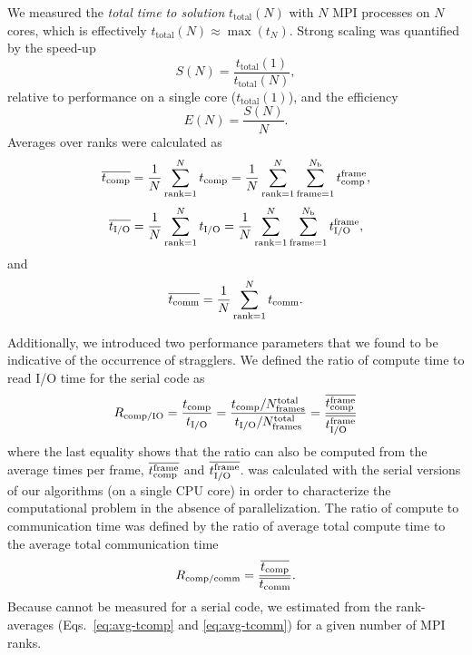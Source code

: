 We measured the \emph{total time to solution} $t_{\text{total}}(N)$ with $N$ MPI processes on $N$ cores, which is effectively
$t_{\text{total}}(N) \approx \max(t_{N})$. 
Strong scaling was quantified by the speed-up
\begin{equation}
  \label{eq:speedup}
  S(N) = \frac{t_{\text{total}}(1)}{t_{\text{total}}(N)},
\end{equation}
relative to performance on a single core ($t_{\text{total}}(1)$), and the efficiency
\begin{equation}
  \label{eq:efficiency}
  E(N) = \frac{S(N)}{N}.
\end{equation}
Averages over ranks were calculated as
\begin{equation}
  \label{eq:avg-tcomp}
  \overline{{t}_{\text{comp}}} = \frac{1}{N}
  \sum_{\text{rank}=1}^{N}{t}_{\text{comp}} = \frac{1}{N}\sum_{\text{rank}=1}^{N}\sum_{\text{frame}=1}^{N_\text{b}}{t}_{\text{comp}}^{\text{frame}},
\end{equation}
\begin{equation}
  \label{eq:avg-tIO}
  \overline{{t}_{\text{I/O}}} = \frac{1}{N}\sum_{\text{rank}=1}^{N}{t}_{\text{I/O}} = \frac{1}{N}\sum_{\text{rank}=1}^{N}\sum_{\text{frame}=1}^{N_{\text{b}}}{t}_{\text{I/O}}^{\text{frame}},
\end{equation}
and
\begin{equation}
  \label{eq:avg-tcomm}
  \overline{t_{\text{comm}}} = \frac{1}{N}\sum_{\text{rank}=1}^{N}t_{\text{comm}}.
\end{equation}

Additionally, we introduced two performance parameters that we found to be indicative of the occurrence of stragglers.
We defined the ratio of compute time to read I/O time for the serial code as
\begin{equation}
  \RcompIO = \frac{\tcomp}{\tIO} = %
  \frac{\tcomp/N_{\text{frames}}^{\text{total}}}{\tIO/N_{\text{frames}}^{\text{total}}}  = %
  \frac{\overline{\tcomp^{\text{frame}}}}{\overline{\tIO^{\text{frame}}}}  
  \label{eq:Compute-IO}
\end{equation}
where the last equality shows that the ratio can also be computed from the average times per frame, $\overline{{t}_{\text{comp}}^{\text{frame}}}$ and $\overline{{t}_{\text{I/O}}^{\text{frame}}}$.
\RcompIO was calculated with the serial versions of our algorithms (on a single CPU core) in order to characterize the computational problem in the absence of parallelization.
The ratio of compute to communication time was defined by the ratio of average total compute time to the average total communication time   
\begin{equation}
  \label{eq:Compute-comm}
  R_{\text{comp/comm}} = \frac{\overline{{t}_{\text{comp}}}}{\overline{t_{\text{comm}}}}.
\end{equation}
Because \tcomm cannot be measured for a serial code, we estimated \Rcompcomm from the rank-averages (Eqs.~\ref{eq:avg-tcomp} and \ref{eq:avg-tcomm}) for a given number of MPI ranks.


